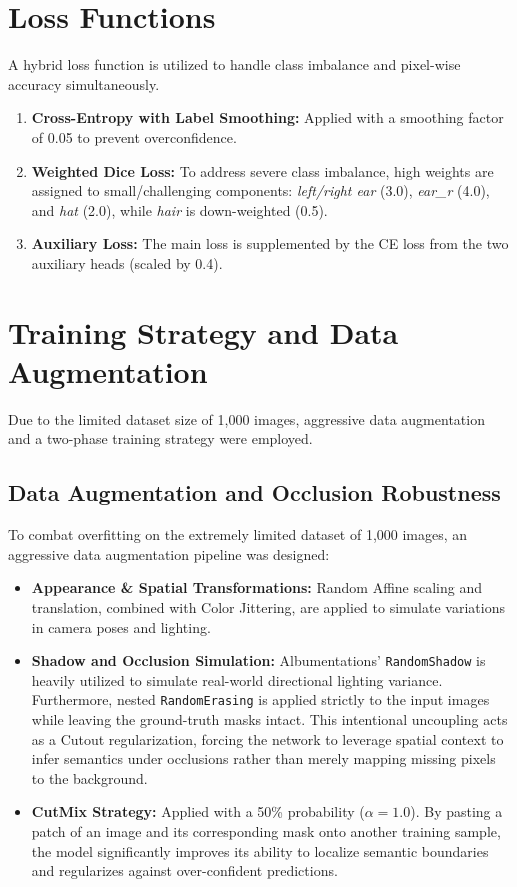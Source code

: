 \documentclass[10pt,a4paper]{article}
\begin{document}
\section{Loss Functions}
A hybrid loss function is utilized to handle class imbalance and pixel-wise accuracy simultaneously. 

\begin{enumerate}[leftmargin=*]
    \item \textbf{Cross-Entropy with Label Smoothing:} Applied with a smoothing factor of 0.05 to prevent overconfidence.
    \item \textbf{Weighted Dice Loss:} To address severe class imbalance, high weights are assigned to small/challenging components: \textit{left/right ear} (3.0), \textit{ear\_r} (4.0), and \textit{hat} (2.0), while \textit{hair} is down-weighted (0.5).
    \item \textbf{Auxiliary Loss:} The main loss is supplemented by the CE loss from the two auxiliary heads (scaled by 0.4).
\end{enumerate}

\section{Training Strategy and Data Augmentation}
Due to the limited dataset size of 1,000 images, aggressive data augmentation and a two-phase training strategy were employed.

\subsection{Data Augmentation and Occlusion Robustness}
To combat overfitting on the extremely limited dataset of 1,000 images, an aggressive data augmentation pipeline was designed:
\begin{itemize}[leftmargin=*]
    \item \textbf{Appearance \& Spatial Transformations:} Random Affine scaling and translation, combined with Color Jittering, are applied to simulate variations in camera poses and lighting.
    \item \textbf{Shadow and Occlusion Simulation:} Albumentations' \texttt{RandomShadow} is heavily utilized to simulate real-world directional lighting variance. Furthermore, nested \texttt{RandomErasing} is applied strictly to the input images while leaving the ground-truth masks intact. This intentional uncoupling acts as a Cutout regularization, forcing the network to leverage spatial context to infer semantics under occlusions rather than merely mapping missing pixels to the background.
    \item \textbf{CutMix Strategy:} Applied with a 50\% probability ($\alpha=1.0$). By pasting a patch of an image and its corresponding mask onto another training sample, the model significantly improves its ability to localize semantic boundaries and regularizes against over-confident predictions.
\end{itemize}
\end{document}
